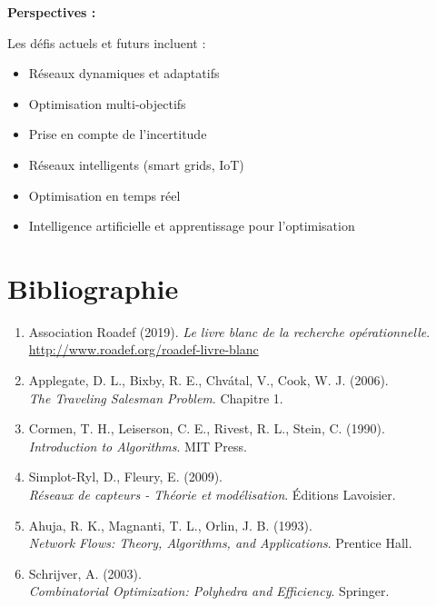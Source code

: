 \documentclass[12pt,a4paper]{article}
\begin{document}
\begin{notecours}
\textbf{Perspectives :}

Les défis actuels et futurs incluent :
\begin{itemize}
    \item Réseaux dynamiques et adaptatifs
    \item Optimisation multi-objectifs
    \item Prise en compte de l'incertitude
    \item Réseaux intelligents (smart grids, IoT)
    \item Optimisation en temps réel
    \item Intelligence artificielle et apprentissage pour l'optimisation
\end{itemize}
\end{notecours}

\newpage
\section*{Bibliographie}

\begin{enumerate}
    \item Association Roadef (2019). \textit{Le livre blanc de la recherche opérationnelle}. \\
    \url{http://www.roadef.org/roadef-livre-blanc}
    
    \item Applegate, D. L., Bixby, R. E., Chvátal, V., Cook, W. J. (2006). \\
    \textit{The Traveling Salesman Problem}. Chapitre 1.
    
    \item Cormen, T. H., Leiserson, C. E., Rivest, R. L., Stein, C. (1990). \\
    \textit{Introduction to Algorithms}. MIT Press.
    
    \item Simplot-Ryl, D., Fleury, E. (2009). \\
    \textit{Réseaux de capteurs - Théorie et modélisation}. Éditions Lavoisier.
    
    \item Ahuja, R. K., Magnanti, T. L., Orlin, J. B. (1993). \\
    \textit{Network Flows: Theory, Algorithms, and Applications}. Prentice Hall.
    
    \item Schrijver, A. (2003). \\
    \textit{Combinatorial Optimization: Polyhedra and Efficiency}. Springer.
\end{enumerate}
\end{document}

